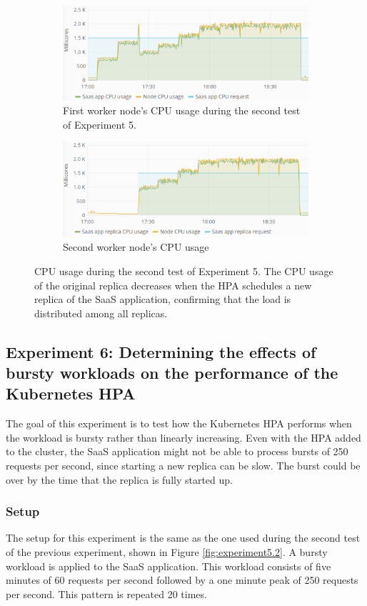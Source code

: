 \begin{figure}
\centering
\begin{subfigure}[b]{\columnwidth}
\centering
\includegraphics[width=0.75\columnwidth]{Images/Experiments/CPU/Grafana/cpu-saas-hpa-li-1.PNG}
\caption{First worker node's CPU usage during the second test of Experiment 5.}
\label{fig:cpu-saas-hpa-li-1}
\end{subfigure}
\hfill
\begin{subfigure}[b]{\columnwidth}
\centering
\includegraphics[width=0.75\columnwidth]{Images/Experiments/CPU/Grafana/cpu-saas-hpa-li-2.PNG}
\caption{Second worker node's CPU usage}
\label{fig:cpu-saas-hpa-li-2}
\end{subfigure}
\hfill
\caption{CPU usage during the second test of Experiment 5. The CPU usage of the original replica decreases when the HPA schedules a new replica of the SaaS application, confirming that the load is distributed among all replicas.}
\label{fig:cpu-cas-hpa-li-2}
\end{figure}

\subsection{Experiment 6: Determining the effects of bursty workloads on the performance of the Kubernetes HPA}
The goal of this experiment is to test how the Kubernetes HPA performs when the workload is bursty rather than linearly increasing. Even with the HPA added to the cluster, the SaaS application might not be able to process bursts of 250 requests per second, since starting a new replica can be slow. The burst could be over by the time that the replica is fully started up.

\subsubsection{Setup}
The setup for this experiment is the same as the one used during the second test of the previous experiment, shown in Figure \ref{fig:experiment5.2}. A bursty workload is applied to the SaaS application. This workload consists of five minutes of 60 requests per second followed by a one minute peak of 250 requests per second. This pattern is repeated 20 times.  

